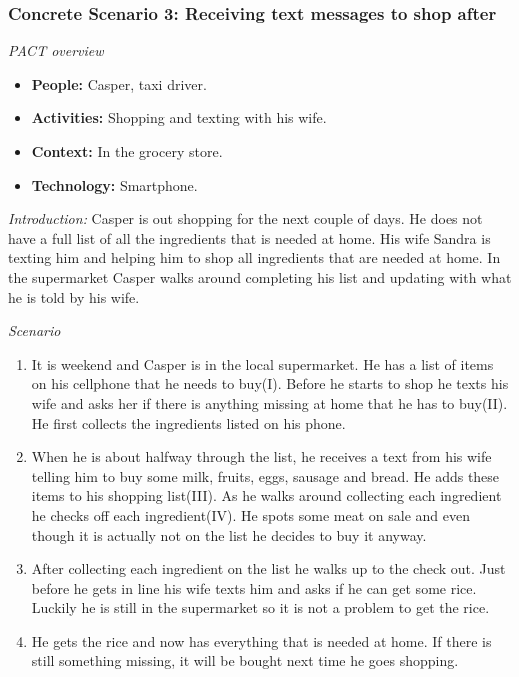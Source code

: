 \subsubsection{Concrete Scenario 3: Receiving text messages to shop after} \label{ConcreteScenario3}

\emph{PACT overview}
\begin{itemize}
\item \textbf{People:} Casper, taxi driver.  
\item \textbf{Activities:} Shopping and texting with his wife.
\item \textbf{Context:} In the grocery store.
\item \textbf{Technology:} Smartphone.
\end{itemize}

\emph{Introduction:} Casper is out shopping for the next couple of days. He does not have a full list of all the ingredients that is needed at home. His wife Sandra is texting him and helping him to shop all ingredients that are needed at home. In the supermarket Casper walks around completing his list and updating with what he is told by his wife.  

\emph{Scenario}
\begin{enumerate}
\item It is weekend and Casper is in the local supermarket. He has a list of items on his cellphone that he needs to buy(I). Before he starts to shop he texts his wife and asks her if there is anything missing at home that he has to buy(II). He first collects the ingredients listed on his phone.   
\item  When he is about halfway through the list, he receives a text from his wife telling him to buy some milk, fruits, eggs, sausage and bread. He adds these items to his shopping list(III). As he walks around collecting each ingredient he checks off each ingredient(IV). He spots some meat on sale and even though it is actually not on the list he decides to buy it anyway.  
\item After collecting each ingredient on the list he walks up to the check out. Just before he gets in line his wife texts him and asks if he can get some rice. Luckily he is still in the supermarket so it is not a problem to get the rice.  
\item He gets the rice and now has everything that is needed at home. If there is still something missing, it will be bought next time he goes shopping.
\end{enumerate}

